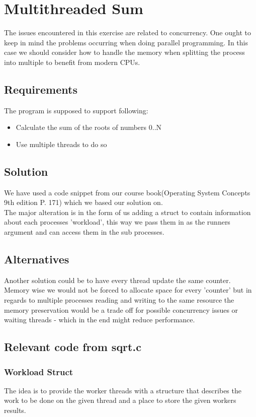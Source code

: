 \chapter{Multithreaded Sum}
The issues encountered in this exercise are related to concurrency. One ought to keep in mind the problems occurring when doing parallel programming. In this case we should consider how to handle the memory when splitting the process into multiple to benefit from modern CPUs. 

\section{Requirements}
The program is supposed to support following:
\begin{itemize}
\item Calculate the sum of the roots of numbers 0..N
\item Use multiple threads to do so
\end{itemize}

\section{Solution}
We have used a code snippet from our course book(Operating System Concepts 9th edition P. 171) which we based our solution on.\\

The major alteration is in the form of us adding a struct to contain information about each processes 'workload', this way we pass them in as the runners argument and can access them in the sub processes.\\

\section{Alternatives}
Another solution could be to have every thread update the same counter. Memory wise we would not be forced to allocate space for every 'counter' but in regards to multiple processes reading and writing to the same resource the memory preservation would be a trade off for possible concurrency issues or waiting threads - which in the end might reduce performance.

\section{Relevant code from sqrt.c}
\subsection{Workload Struct}
The idea is to provide the worker threads with a structure that describes the work to be done on the given thread and a place to store the given workers results.\\


